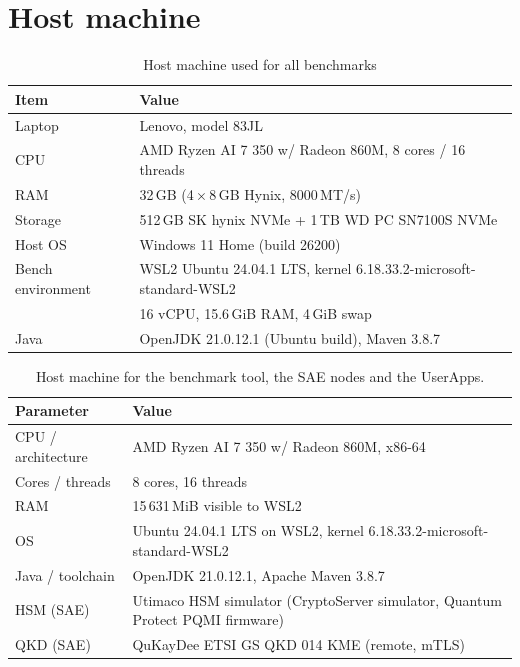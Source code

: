 \documentclass[11pt,a4paper]{report}
\begin{document}
\section{Host machine}
\begin{table}[htbp]
  \centering
  \caption{Host machine used for all benchmarks}
  \label{tab:host-machine}
  \begin{tabular}{ll}
    \hline
    \textbf{Item} & \textbf{Value} \\
    \hline
    Laptop            & Lenovo, model 83JL \\
    CPU               & AMD Ryzen AI 7 350 w/ Radeon 860M, 8 cores / 16 threads \\
    RAM               & 32\,GB (4\,$\times$\,8\,GB Hynix, 8000\,MT/s) \\
    Storage           & 512\,GB SK hynix NVMe + 1\,TB WD PC SN7100S NVMe \\
    Host OS           & Windows 11 Home (build 26200) \\
    Bench environment & WSL2 Ubuntu 24.04.1 LTS, kernel 6.18.33.2-microsoft-standard-WSL2 \\
                      & 16 vCPU, 15.6\,GiB RAM, 4\,GiB swap \\
    Java              & OpenJDK 21.0.12.1 (Ubuntu build), Maven 3.8.7 \\
    \hline
  \end{tabular}
\end{table}
\begin{table}[htbp]
\centering\small
\begin{tabular}{p{}p{}}
\toprule
Parameter & Value \\
\midrule
CPU / architecture & AMD Ryzen AI 7 350 w/ Radeon 860M, x86-64 \\
Cores / threads & 8 cores, 16 threads \\
RAM & 15\,631\,MiB visible to WSL2 \\
OS & Ubuntu 24.04.1 LTS on WSL2, kernel 6.18.33.2-microsoft-standard-WSL2 \\
Java / toolchain & OpenJDK 21.0.12.1, Apache Maven 3.8.7 \\
HSM (SAE) & Utimaco HSM simulator (CryptoServer simulator, Quantum Protect PQMI firmware) \\
QKD (SAE) & QuKayDee ETSI GS QKD 014 KME (remote, mTLS) \\
\bottomrule
\end{tabular}
\caption{Host machine for the benchmark tool, the SAE nodes and the UserApps.}
\label{tab:hw-host}
\end{table}
\FloatBarrier
\end{document}
